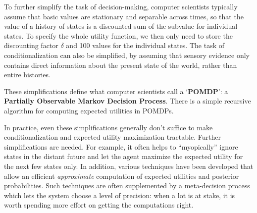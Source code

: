 To further simplify the task of decision-making, computer scientists
typically assume that basic values are stationary and separable across
times, so that the value of a history of states is a discounted sum of
the subvalue for individual states. To specify the whole utility
function, we then only need to store the discounting factor $\delta$
and 100 values for the individual states. The task of
conditionalization can also be simplified, by assuming that sensory
evidence only contains direct information about the present state of
the world, rather than entire histories.

These simplifications define what computer scientists call a
`\textbf{POMDP}': a \textbf{Partially Observable Markov Decision
  Process}. There is a simple recursive algorithm for computing
expected utilities in POMDPs.%



In practice, even these simplifications generally don't suffice to
make conditionalization and expected utility maximization
tractable. Further simplifications are needed. For example, it often
helps to ``myopically'' ignore states in the distant future and let
the agent maximize the expected utility for the next few states
only. In addition, various techniques have been developed that allow
an efficient \emph{approximate} computation of expected utilities and
posterior probabilities. Such techniques are often supplemented by a
meta-decision process which lets the system choose a level of
precision: when a lot is at stake, it is worth spending more effort on
getting the computations right.


